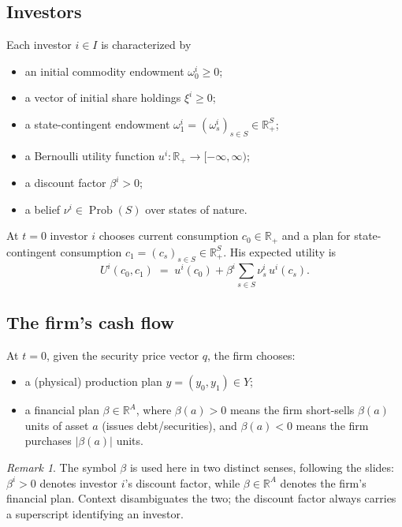 \documentclass[11pt,a4paper]{article}
\def\R{\mathbb{R}}
\def\geq{\geqslant}
\DeclareMathOperator{\Prob}{Prob}
\theoremstyle{plain}
\theoremstyle{definition}
\theoremstyle{remark}
\newtheorem{remark}[theorem]{Remark}
\begin{document}
\subsection{Investors}

Each investor $i\in I$ is characterized by
\begin{itemize}
  \item an initial commodity endowment $\omega^i_0\geq 0$;
  \item a vector of initial share holdings $\xi^i\geq 0$;
  \item a state-contingent endowment $\omega^i_1=(\omega^i_s)_{s\in S}\in \R^{S}_{+}$;
  \item a Bernoulli utility function $u^i:\R_+ \to [-\infty,\infty)$;
  \item a discount factor $\beta^i>0$;
  \item a belief $\nu^i\in \Prob(S)$ over states of nature.
\end{itemize}
At $t=0$ investor $i$ chooses current consumption $c_0\in\R_+$ and a plan for state-contingent consumption $c_1=(c_s)_{s\in S}\in\R_+^S$. His expected utility is
\begin{equation}\label{eq:expected-utility}
  U^i(c_0,c_1) \;=\; u^i(c_0) + \beta^i \sum_{s\in S} \nu^i_s\, u^i(c_s).
\end{equation}

\subsection{The firm's cash flow}

At $t=0$, given the security price vector $q$, the firm chooses:
\begin{itemize}
  \item a (physical) production plan $y=(y_0,y_1)\in Y$;
  \item a financial plan $\beta \in \R^A$, where $\beta(a)>0$ means the firm short-sells $\beta(a)$ units of asset $a$ (issues debt/securities), and $\beta(a)<0$ means the firm purchases $|\beta(a)|$ units.
\end{itemize}

\begin{remark}\label{rem:beta-abuse}
The symbol $\beta$ is used here in two distinct senses, following the slides: $\beta^i>0$ denotes investor $i$'s discount factor, while $\beta\in\R^A$ denotes the firm's financial plan. Context disambiguates the two; the discount factor always carries a superscript identifying an investor.
\end{remark}
\end{document}
